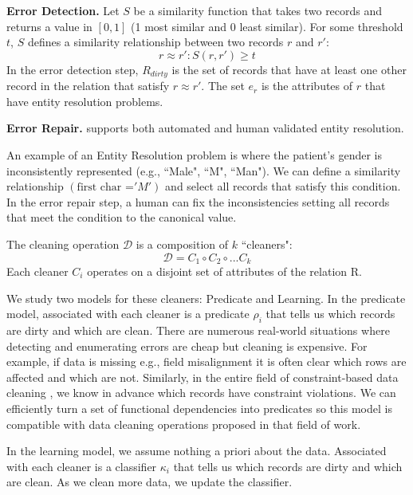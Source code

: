 \vspace{0.5em}

\noindent\textbf{Error Detection. } Let $S$ be a similarity function that takes two records and returns a value in $[0,1]$ (1 most similar and 0 least similar). For some threshold $t$, $S$ defines a similarity relationship between two records $r$ and $r'$:
\[
r \approx r' : S(r,r') \ge t
\] 
In the error detection step, $R_{dirty}$ is the set of records that have at least one other record in the relation that satisfy $r \approx r'$.
The set $e_r$ is the attributes of $r$ that have entity resolution problems.

\vspace{0.5em}

\noindent\textbf{Error Repair. } \sys supports both automated and human validated entity resolution.

\begin{example}
An example of an Entity Resolution problem is where the patient's gender is inconsistently represented (e.g., ``Male", ``M", ``Man"). 
We can define a similarity relationship $(\text{first char =} 'M')$ and select all records that satisfy this condition.
In the error repair step, a human can fix the inconsistencies setting all records that meet the condition to the canonical value.
\end{example}

\iffalse

The cleaning operation $\mathcal{D}$ is a composition of $k$ ``cleaners":
\[
\mathcal{D}= C_{1} \circ C_{2} \circ ... C_{k}
\]
Each cleaner $C_i$ operates on a disjoint set of attributes of the relation R.

We study two models for these cleaners: Predicate and Learning.
In the predicate model, associated with each cleaner is a predicate $\rho_i$ that 
tells us which records are dirty and which are clean.
There are numerous real-world situations where detecting and enumerating errors are cheap but cleaning is expensive.
For example, if data is missing e.g., field misalignment it is often clear which rows are affected and which are not.
Similarly, in the entire field of constraint-based data cleaning \cite{nadeef}, we know in advance which records have constraint violations.
We can efficiently turn a set of functional dependencies into predicates so this model is compatible with data cleaning operations proposed in that field of work.

In the learning model, we assume nothing a priori about the data.
Associated with each cleaner is a classifier $\kappa_i$ that 
tells us which records are dirty and which are clean.
As we clean more data, we update the classifier.

